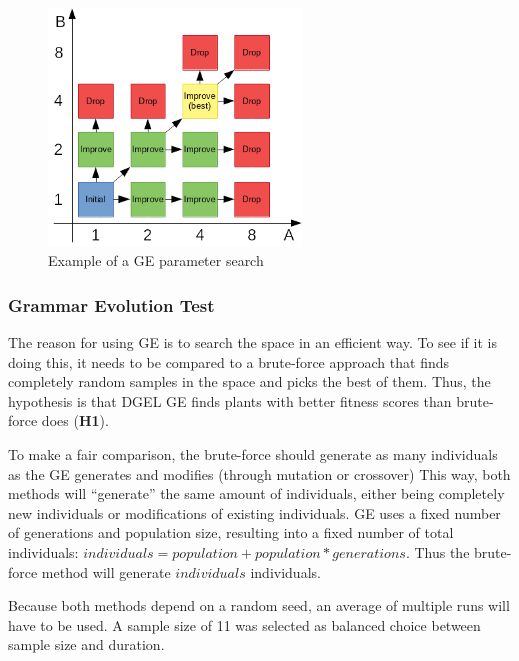 \begin{figure}
    \centering
    \includegraphics[width=0.6\textwidth]{figures/parameter-search}
    \caption[Example of a GE parameter search]{Example of a \gls{GE} parameter search}
    \label{fig:parameter-search}
\end{figure}

\subsubsection{Grammar Evolution Test}
The reason for using \gls{GE} is to search the space in an efficient way.
To see if it is doing this, it needs to be compared to a brute-force approach that finds completely random samples in the space and picks the best of them.
Thus, the hypothesis is that \gls{DGEL} \gls{GE} finds plants with better fitness scores than brute-force does (\textbf{H1}).

To make a fair comparison, the brute-force should generate as many individuals as the \gls{GE} generates and modifies (through mutation or crossover)
This way, both methods will ``generate'' the same amount of individuals, either being completely new individuals or modifications of existing individuals.
\gls{GE} uses a fixed number of generations and population size, resulting into a fixed number of total individuals: $individuals = population + population * generations$.
Thus the brute-force method will generate $individuals$ individuals.

Because both methods depend on a random seed, an average of multiple runs will have to be used.
A sample size of 11 was selected as balanced choice between sample size and duration.

